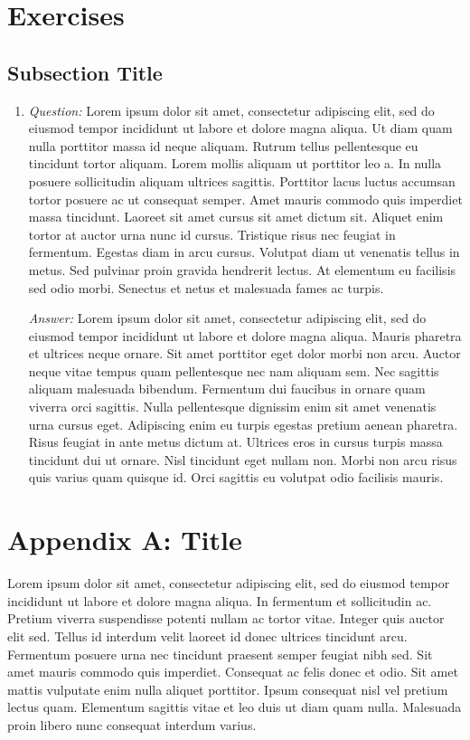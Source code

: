 \documentclass[10pt,letterpaper,twocolumn]{article}
\begin{document}
\section{Exercises}
\setcounter{equation}{0}

\subsection{Subsection Title}

\begin{enumerate}
  \item \textit{Question:} Lorem ipsum dolor sit amet, consectetur adipiscing elit, sed do eiusmod tempor incididunt ut labore et dolore magna aliqua. Ut diam quam nulla porttitor massa id neque aliquam. Rutrum tellus pellentesque eu tincidunt tortor aliquam. Lorem mollis aliquam ut porttitor leo a. In nulla posuere sollicitudin aliquam ultrices sagittis. Porttitor lacus luctus accumsan tortor posuere ac ut consequat semper. Amet mauris commodo quis imperdiet massa tincidunt. Laoreet sit amet cursus sit amet dictum sit. Aliquet enim tortor at auctor urna nunc id cursus. Tristique risus nec feugiat in fermentum. Egestas diam in arcu cursus. Volutpat diam ut venenatis tellus in metus. Sed pulvinar proin gravida hendrerit lectus. At elementum eu facilisis sed odio morbi. Senectus et netus et malesuada fames ac turpis.

  \bigskip\noindent\textit{Answer:} Lorem ipsum dolor sit amet, consectetur adipiscing elit, sed do eiusmod tempor incididunt ut labore et dolore magna aliqua. Mauris pharetra et ultrices neque ornare. Sit amet porttitor eget dolor morbi non arcu. Auctor neque vitae tempus quam pellentesque nec nam aliquam sem. Nec sagittis aliquam malesuada bibendum. Fermentum dui faucibus in ornare quam viverra orci sagittis. Nulla pellentesque dignissim enim sit amet venenatis urna cursus eget. Adipiscing enim eu turpis egestas pretium aenean pharetra. Risus feugiat in ante metus dictum at. Ultrices eros in cursus turpis massa tincidunt dui ut ornare. Nisl tincidunt eget nullam non. Morbi non arcu risus quis varius quam quisque id. Orci sagittis eu volutpat odio facilisis mauris.
\end{enumerate}

\section{Appendix A: Title}
\setcounter{secnumdepth}{0}

Lorem ipsum dolor sit amet, consectetur adipiscing elit, sed do eiusmod tempor incididunt ut labore et dolore magna aliqua. In fermentum et sollicitudin ac. Pretium viverra suspendisse potenti nullam ac tortor vitae. Integer quis auctor elit sed. Tellus id interdum velit laoreet id donec ultrices tincidunt arcu. Fermentum posuere urna nec tincidunt praesent semper feugiat nibh sed. Sit amet mauris commodo quis imperdiet. Consequat ac felis donec et odio. Sit amet mattis vulputate enim nulla aliquet porttitor. Ipsum consequat nisl vel pretium lectus quam. Elementum sagittis vitae et leo duis ut diam quam nulla. Malesuada proin libero nunc consequat interdum varius.
\end{document}
